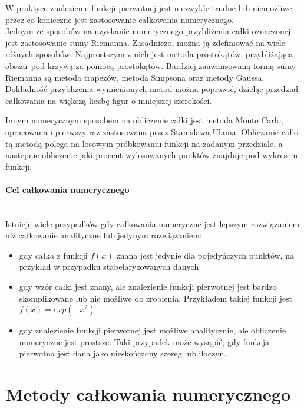 \documentclass[12pt,twoside]{article}
\begin{document}
W praktyce znalezienie funkcji pierwotnej jest niezwykle trudne lub niemożliwe, przez co konieczne jest zastosowanie całkowania numerycznego.\\
Jednym ze sposobów na uzyskanie numerycznego przybliżenia całki oznaczonej jest zastosowanie sumy Riemanna.
Zasadniczo, można ją zdefiniować na wiele różnych sposobów.
Najprostszym z nich jest metoda prostokątów, przybliżająca obszar pod krzywą za pomocą prostokątów.
Bardziej zaawansowaną formą sumy Riemanna są metoda trapezów, metoda Simpsona oraz metody Gaussa.
Dokładność przybliżenia wymienionych metod można poprawić, dzieląc przedział całkowania na większą liczbę figur o mniejszej szerokości.
\newline

	Innym numerycznym sposobem na obliczenie całki jest metoda Monte Carlo, opracowana i pierwszy raz zastosowana przez Stanisława Ulama.
Obliczanie całki tą metodą polega na losowym próbkowaniu funkcji na zadanym przedziale, a nastepnie obliczenie jaki procent wylosowanych punktów znajduje pod wykresem funkcji\cite{Intro_1}.

\paragraph{Cel całkowania numerycznego}\mbox{} \\

Istnieje wiele przypadków gdy całkowania numeryczne jest lepszym rozwiązaniem niż całkowanie analityczne lub jedynym rozwiązaniem:
\begin{itemize}
	\item gdy całka z funkcji $f(x)$ znana jest jedynie dla pojedyńczych punktów, na przykład w przypadku stabelaryzowanych danych
	\item gdy wzór całki jest znany, ale znalezienie funkcji pierwotnej jest bardzo skomplikowane lub nie możliwe do zrobienia. Przykładem takiej funkcji jest $f(x) = exp(-x^2)$
	\item gdy znalezienie funkcji pierwotnej jest możliwe analitycznie, ale obliczenie numeryczne jest prostsze. Taki przypadek może wysąpić, gdy funkcja pierwotna jest dana jako nieskończony szereg lub iloczyn\cite{Intro_2}.
\end{itemize}


\clearpage

\section{Metody całkowania numerycznego}
\end{document}
